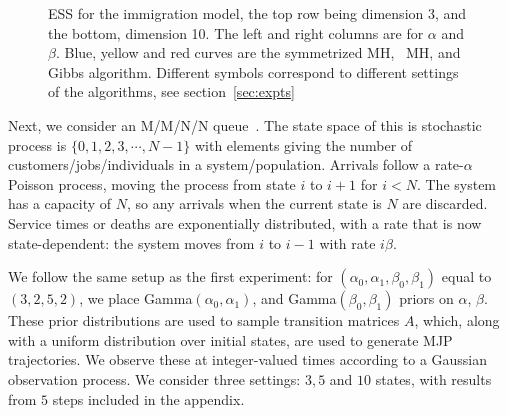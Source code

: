 \begin{figure}[H]
\begin{minipage}[hp]{0.24\linewidth}
	\end{minipage}
    \caption{ESS for the immigration model, the top row being dimension 3, and the bottom, dimension 10. The left and right columns are for $\alpha$ and $\beta$. Blue, yellow and red curves are the symmetrized MH, \naive\ MH, and Gibbs algorithm. Different symbols correspond to different settings of the algorithms, see section~\ref{sec:expts}}
     \label{fig:ESS_Q_notpersec}
  \end{figure}


Next, we consider an M/M/N/N queue~\citep{gross2011fundamentals}. The state space of this is stochastic 
process is $\{0, 1, 2, 3, \cdots, N - 1\}$ with 
elements giving the number of customers/jobs/individuals in a system/population. 
Arrivals follow a rate-$\alpha$ Poisson process, moving the process from state 
$i$ to $i+1$ for $i<N$. The system has a capacity of $N$, so any arrivals when 
the current state is $N$ are discarded.  Service times or deaths are 
exponentially distributed, with a rate that is now state-dependent:
the system moves from $i$ to $i - 1$ with rate $i\beta$. 




We follow the same setup as the first experiment:
for $(\alpha_0,\alpha_1,\beta_0,\beta_1)$ equal to $(3,2,5,2)$,
we place Gamma$(\alpha_0,\alpha_1)$, and Gamma$(\beta_0, \beta_1)$ priors on 
$\alpha$, $\beta$. These prior distributions are used to sample transition 
matrices $A$, which, along with a uniform distribution over initial states,
are used to generate MJP trajectories. We observe these at integer-valued
times according to a Gaussian observation process.
We consider three settings: $3, 5$ and $10$ states, with results from $5$ 
steps included in the appendix. 

